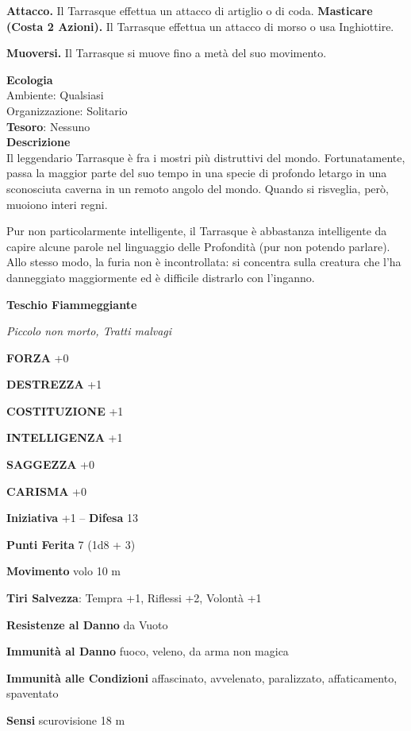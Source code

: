 \begin{multicols}{2}
\textbf{Attacco.} Il Tarrasque effettua un attacco di artiglio o di coda. \textbf{Masticare (Costa 2 Azioni).} Il Tarrasque effettua un attacco di morso o usa Inghiottire.

\textbf{Muoversi.} Il Tarrasque si muove fino a metà del suo movimento.

\textbf{Ecologia}\\
Ambiente: Qualsiasi\\
Organizzazione: Solitario\\
\textbf{Tesoro}: Nessuno\\
\textbf{Descrizione}\\
Il leggendario Tarrasque è fra i mostri più distruttivi del mondo. Fortunatamente, passa la maggior parte del suo tempo in una specie di profondo letargo in una sconosciuta caverna in un remoto angolo del mondo. Quando si risveglia, però, muoiono interi regni.

Pur non particolarmente intelligente, il Tarrasque è abbastanza intelligente da capire alcune parole nel linguaggio delle Profondità (pur non potendo parlare). Allo stesso modo, la furia non è incontrollata: si concentra sulla creatura che l'ha danneggiato maggiormente ed è difficile distrarlo con l'inganno.

\medskip{}\textbf{Teschio Fiammeggiante}

\textit{Piccolo non morto, Tratti malvagi}

\textbf{FORZA} +0

\textbf{DESTREZZA} +1

\textbf{COSTITUZIONE} +1

\textbf{INTELLIGENZA} +1

\textbf{SAGGEZZA} +0

\textbf{CARISMA} +0

\textbf{Iniziativa} +1 -- \textbf{Difesa} 13

\textbf{Punti Ferita} 7 (1d8 + 3)

\textbf{Movimento} volo 10 m

\textbf{Tiri Salvezza}: Tempra +1, Riflessi +2, Volontà +1

\textbf{Resistenze al Danno} da Vuoto

\textbf{Immunità al Danno} fuoco, veleno, da arma non magica

\textbf{Immunità alle Condizioni} affascinato, avvelenato, paralizzato, affaticamento, spaventato

\textbf{Sensi} scurovisione 18 m


\end{multicols}
